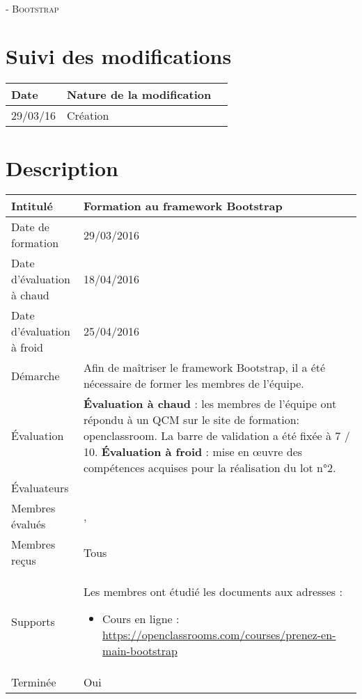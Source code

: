\documentclass[asi, sansVersion]{picInsa}
\begin{document}
	\begin{center}
		\LARGE
		\textsc{
			\FF{}\\
			 - Bootstrap
		}
	\end{center}
	\vspace{0.5cm}

	\section*{Suivi des modifications}
		\begin{table}[H]
			\centering
			\begin{tabularx}{18cm}{|p{1.7cm}|X|p{4cm}|}
				\hline
				\rowcolor[gray]{0.90} Date & Nature de la modification \\
				\hline
				
				29/03/16 & Création \\
				\hline
			\end{tabularx}
		\end{table}

	\section*{Description}
		\begin{longtable}{|p{}|p{}|}
			\hline
			\cellcolor{gris2} Intitulé & Formation au framework Bootstrap\\\hline
			\cellcolor{gris2} Date de formation & 29/03/2016\\\hline
			\cellcolor{gris2} Date d'évaluation à chaud & 18/04/2016 \\\hline
			\cellcolor{gris2} Date d'évaluation à froid & 25/04/2016\\\hline
			\cellcolor{gris2} Démarche & Afin de maîtriser le framework Bootstrap, il a été nécessaire de former les membres de l'équipe.\\\hline
			\cellcolor{gris2} Évaluation &
				\textbf{Évaluation à chaud} : les membres de l'équipe ont répondu à un QCM sur le site de formation: openclassroom. La barre de validation a été fixée à 7 / 10.\newline
				\textbf{Évaluation à froid} : mise en œuvre des compétences acquises pour la réalisation du lot n°2.\\\hline
			\cellcolor{gris2} Évaluateurs & \Matthieu{}\\\hline
			\cellcolor{gris2} Membres évalués & \Mathieu{}, \Julie{}\\\hline
			\cellcolor{gris2} Membres reçus & Tous \\\hline
			\cellcolor{gris2} Supports & Les membres ont étudié les documents aux adresses : \begin{itemize}
			\item Cours en ligne : \url{https://openclassrooms.com/courses/prenez-en-main-bootstrap}
		\end{itemize}
			 \\\hline
			\cellcolor{gris2} Terminée & Oui \\\hline
		\end{longtable}
\end{document}
